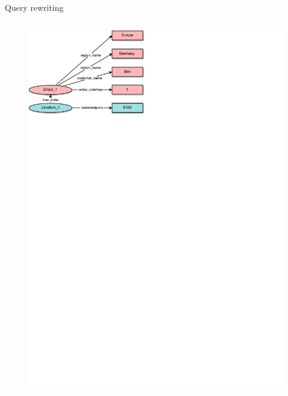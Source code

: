 \begin{frame}[fragile]{Query rewriting}
\begin{columns}
\begin{figure}
    \includegraphics[trim=0 648 280 0,clip,width=1\textwidth]{images/starpattern.pdf}
\end{figure}
\end{columns}
\end{frame}

